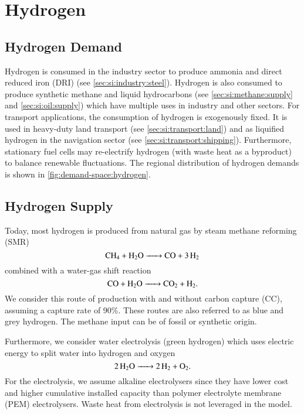 \section{Hydrogen}
\label{sec:si:h2}

\subsection{Hydrogen Demand}
\label{sec:si:h2:demand}

Hydrogen is consumed in the industry sector to produce ammonia and direct
reduced iron (DRI) (see \cref{sec:si:industry:steel}). Hydrogen is also consumed
to produce synthetic methane and liquid hydrocarbons (see
\cref{sec:si:methane:supply} and \cref{sec:si:oil:supply}) which have multiple
uses in industry and other sectors. For transport applications, the consumption
of hydrogen is exogenously fixed. It is used in heavy-duty land transport (see
\cref{sec:si:transport:land}) and as liquified hydrogen in the navigation sector
(see \cref{sec:si:transport:shipping}). Furthermore, stationary fuel cells may
re-electrify hydrogen (with waste heat as a byproduct) to balance renewable
fluctuations. The regional distribution of hydrogen demands is shown in
\cref{fig:demand-space:hydrogen}.

\subsection{Hydrogen Supply}
\label{sec:si:h2:supply}

Today, most hydrogen is produced from natural gas by steam methane reforming
(SMR)
\begin{equation}
    \ce{ CH4 + H2O -> CO + 3H2 }
\end{equation}
combined with a water-gas shift reaction
\begin{equation}
    \ce{CO + H2O -> CO2 + H2}.
\end{equation}
We consider this route of production with and without carbon capture (CC),
assuming a capture rate of 90\%. These routes are also referred to as blue and
grey hydrogen. The methane input can be of fossil or synthetic origin.

Furthermore, we consider water electrolysis (green hydrogen) which uses electric
energy to split water into hydrogen and oxygen
\begin{equation}
    \ce{2H2O -> 2 H2 + O2}.
\end{equation}
For the electrolysis, we assume alkaline electrolysers since they have lower
cost \citeS{} and higher cumulative installed capacity \citeS{} than polymer
electrolyte membrane (PEM) electrolysers. Waste heat from electrolysis is not
leveraged in the model.

